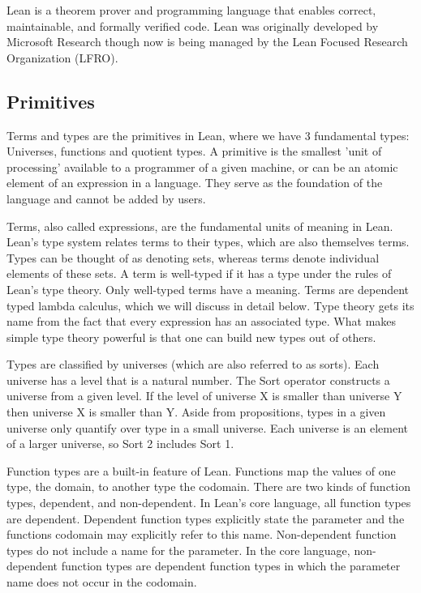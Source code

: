 \documentclass{article}
\begin{document}
Lean is a theorem prover and programming language that enables correct, maintainable, and formally verified code. Lean was originally developed by Microsoft Research though now is being managed by the Lean Focused Research Organization (LFRO). 

\subsection{Primitives}

Terms and types are the primitives in Lean, where we have 3 fundamental types: Universes, functions and quotient types. A primitive is the smallest 'unit of processing' available to a programmer of a given machine, or can be an atomic element of an expression in a language. They serve as the foundation of the language and cannot be added by users. 

Terms, also called expressions, are the fundamental units of meaning in Lean.  Lean's type system relates terms to their types, which are also themselves terms. Types can be thought of as denoting sets, whereas terms denote individual elements of these sets. A term is well-typed if it has a type under the rules of Lean's type theory. Only well-typed terms have a meaning. Terms are dependent typed lambda calculus, which we will discuss  in detail below. Type theory gets its name from the fact that every expression has an associated type. What makes simple type theory powerful is that one can build new types out of others. 

Types are classified by universes (which are also referred to as sorts). Each universe has a level that is a natural number. The Sort operator constructs a universe from a given level. If the level of universe X is smaller than universe Y then universe X is smaller than Y.  Aside from propositions, types in a given universe only quantify over type in a small universe. Each universe is an element of a larger universe, so Sort 2 includes Sort 1. 

Function types are a built-in feature of Lean. Functions map the values of one type, the domain, to another type the codomain. There are two kinds of function types, dependent, and non-dependent. In Lean’s core language, all function types are dependent. Dependent function types explicitly state the parameter and the functions codomain may explicitly refer to this name. Non-dependent function types do not include a name for the parameter. In the core language, non-dependent function types are dependent function types in which the parameter name does not occur in the codomain.
\end{document}
